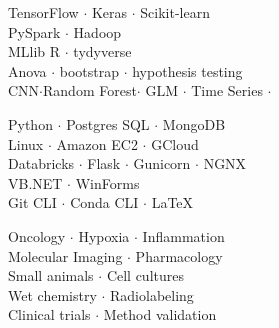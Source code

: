 \documentclass[9pt]{developercv} %
\begin{document}
\vspace{0.5cm}


\begin{minipage}[t]{0.35\textwidth} %
	\vspace{-\baselineskip} %
	
	TensorFlow $\cdot$ Keras $\cdot$ Scikit-learn\\
	PySpark $\cdot$ Hadoop \\ MLlib
	R  $\cdot$ tydyverse \\
	Anova $\cdot$ bootstrap $\cdot$ hypothesis testing\\
	CNN$\cdot$Random Forest$\cdot$ GLM $\cdot$ Time Series  $\cdot$\\
\end{minipage}
\hspace{0.005\textwidth}
\begin{minipage}[t]{0.31\textwidth} %
	\vspace{-\baselineskip} %
	
	Python $\cdot$ Postgres SQL $\cdot$ MongoDB \\
	Linux $\cdot$ Amazon EC2 $\cdot$ GCloud\\
	Databricks $\cdot$ Flask $\cdot$ Gunicorn $\cdot$ NGNX \\
	VB.NET $\cdot$ WinForms\\
	Git CLI $\cdot$ Conda CLI $\cdot$ \LaTeX
\end{minipage}
\hspace{0.005\textwidth}
\begin{minipage}[t]{0.33\textwidth} %
	\vspace{-\baselineskip} %
	
	Oncology $\cdot$ Hypoxia $\cdot$ Inflammation\\
	Molecular Imaging $\cdot$ Pharmacology\\
	Small animals $\cdot$ Cell cultures\\
	Wet chemistry $\cdot$ Radiolabeling\\
	Clinical trials $\cdot$ Method validation\\
\end{minipage}
\end{document}
